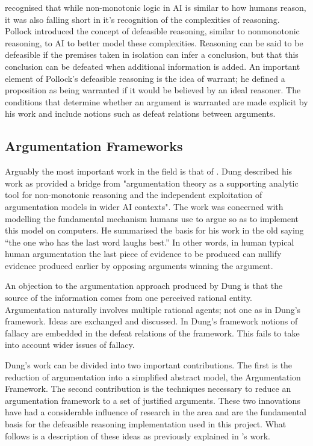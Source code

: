 \cite{pollock1987defeasible} recognised that while non-monotonic logic in AI is similar to how humans reason, it was also falling short in it’s recognition of the complexities of reasoning. Pollock introduced the concept of defeasible reasoning, similar to nonmonotonic reasoning, to AI to better model these complexities. Reasoning can be said to be defeasible if the premises taken in isolation can infer a conclusion, but that this conclusion can be defeated when additional information is added. An important element of Pollock's defeasible reasoning is the idea of warrant; he defined a proposition as being warranted if it would be believed by an ideal reasoner. The conditions that determine whether an argument is warranted are made explicit by his work and include notions such as defeat relations between arguments.

\subsection{Argumentation Frameworks}

Arguably the most important work in the field is that of \cite{dung1995acceptability}. Dung described his work as provided a bridge from "argumentation theory as a supporting analytic tool for non-monotonic reasoning and the independent exploitation of argumentation models in wider AI contexts". The work was concerned with modelling the fundamental mechanism humans use to argue so as to implement this model on computers. He summarised the basis for his work in the old saying “the one who has the last word laughs best.” In other words, in human typical human argumentation the last piece of evidence to be produced can nullify evidence produced earlier by opposing arguments winning the argument.

An objection to the argumentation approach produced by Dung is that the source of the information comes from one perceived rational entity. Argumentation naturally involves multiple rational agents; not one as in Dung's framework. Ideas are exchanged and discussed. In Dung's framework notions of fallacy are embedded in the defeat relations of the framework. This fails to take into account wider issues of fallacy.

Dung's work can be divided into two important contributions. The first is the reduction of argumentation into a simplified abstract model, the Argumentation Framework. The second contribution is the techniques necessary to reduce an argumentation framework to a set of justified arguments. These two innovations have had a considerable influence of research in the area and are the fundamental basis for the defeasible reasoning implementation used in this project. What follows is a description of these ideas as previously explained in \cite{dung1995acceptability}'s work.

